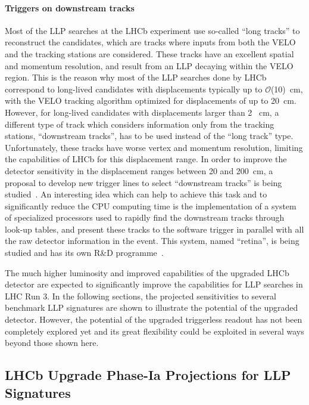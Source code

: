 \paragraph{Triggers on downstream tracks}

Most of the LLP searches at the LHCb experiment use so-called ``long tracks'' to reconstruct the candidates, which are tracks where inputs from both the VELO and the tracking stations are considered. These tracks have an excellent spatial and momentum resolution, and result from an LLP decaying within the VELO region. This is the reason why most of the LLP searches done by LHCb correspond to long-lived candidates with displacements typically up to $\mathcal{O}$(10)~cm, with the VELO tracking algorithm optimized for displacements of up to 20~cm. However, for long-lived candidates with displacements larger than 2~ cm, a different type of track which considers information only from the tracking stations, ``downstream tracks'', has to be used instead of the ``long track'' type. Unfortunately, these tracks have worse vertex and momentum resolution, limiting the capabilities of LHCb for this displacement range. In order to improve the detector sensitivity in the displacement ranges between 20 and 200~cm, a proposal to develop new trigger lines to select ``downstream tracks'' is being studied~\cite{Aaij:2244312}. An interesting idea which can help to achieve this task and to significantly reduce the CPU computing time is the implementation of a system of specialized processors used to rapidly find the downstream tracks through look-up tables, and present these tracks to the software trigger in parallel with all the raw detector information in the event. This system, named ``retina'', is being studied and has its own R\&D programme~\cite{Abba:2014iga}.

The much higher luminosity and improved capabilities of the upgraded LHCb detector are expected to significantly improve the capabilities for LLP searches in LHC Run 3. In the following sections, the projected sensitivities to several benchmark LLP signatures are shown to illustrate the potential of the upgraded detector. However, the potential of the upgraded triggerless readout has not been completely explored yet and its great flexibility could be exploited in several ways beyond those shown here.

\subsection{LHCb Upgrade Phase-Ia Projections for LLP Signatures}
\label{sec:ulhcbphys}

